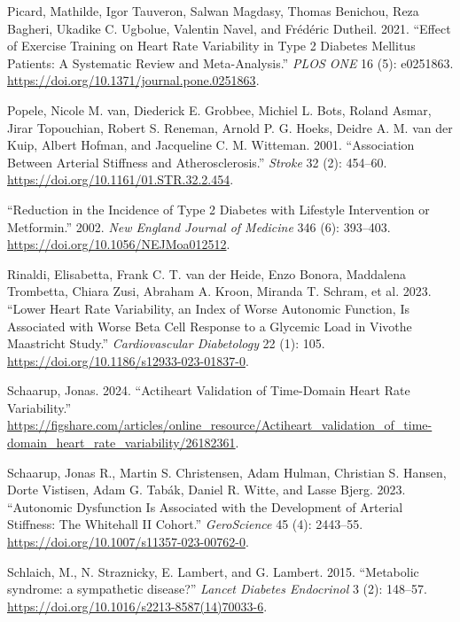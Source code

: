 \documentclass[
  a4paper,
  headsepline=true,
  open=any]{scrbook}
\newlength{\cslhangindent}
\newlength{\cslentryspacingunit} %
\newenvironment{CSLReferences}[2] %
 {%
  \setlength{\parindent}{0pt}
  \ifodd #1
  \let\oldpar\par
  \def\par{\hangindent=\cslhangindent\oldpar}
  \fi
  \setlength{\parskip}{#2\cslentryspacingunit}
 }%
 {}
\begin{document}
\begin{CSLReferences}{1}{0}
\leavevmode{}%
Picard, Mathilde, Igor Tauveron, Salwan Magdasy, Thomas Benichou, Reza
Bagheri, Ukadike C. Ugbolue, Valentin Navel, and Frédéric Dutheil. 2021.
{``Effect of Exercise Training on Heart Rate Variability in Type 2
Diabetes Mellitus Patients: A Systematic Review and Meta-Analysis.''}
\emph{PLOS ONE} 16 (5): e0251863.
\url{https://doi.org/10.1371/journal.pone.0251863}.

\leavevmode{}%
Popele, Nicole M. van, Diederick E. Grobbee, Michiel L. Bots, Roland
Asmar, Jirar Topouchian, Robert S. Reneman, Arnold P. G. Hoeks, Deidre
A. M. van der Kuip, Albert Hofman, and Jacqueline C. M. Witteman. 2001.
{``Association Between Arterial Stiffness and Atherosclerosis.''}
\emph{Stroke} 32 (2): 454--60.
\url{https://doi.org/10.1161/01.STR.32.2.454}.

\leavevmode{}%
{``Reduction in the Incidence of Type 2 Diabetes with Lifestyle
Intervention or Metformin.''} 2002. \emph{New England Journal of
Medicine} 346 (6): 393--403. \url{https://doi.org/10.1056/NEJMoa012512}.

\leavevmode{}%
Rinaldi, Elisabetta, Frank C. T. van der Heide, Enzo Bonora, Maddalena
Trombetta, Chiara Zusi, Abraham A. Kroon, Miranda T. Schram, et al.
2023. {``Lower Heart Rate Variability, an Index of Worse Autonomic
Function, Is Associated with Worse Beta Cell Response to a Glycemic Load
in Vivo{\textemdash}the Maastricht Study.''} \emph{Cardiovascular
Diabetology} 22 (1): 105.
\url{https://doi.org/10.1186/s12933-023-01837-0}.

\leavevmode{}%
Schaarup, Jonas. 2024. {``Actiheart Validation of Time-Domain Heart Rate
Variability.''}
\url{https://figshare.com/articles/online_resource/Actiheart_validation_of_time-domain_heart_rate_variability/26182361}.

\leavevmode{}%
Schaarup, Jonas R., Martin S. Christensen, Adam Hulman, Christian S.
Hansen, Dorte Vistisen, Adam G. Tabák, Daniel R. Witte, and Lasse Bjerg.
2023. {``Autonomic Dysfunction Is Associated with the Development of
Arterial Stiffness: The Whitehall II Cohort.''} \emph{GeroScience} 45
(4): 2443--55. \url{https://doi.org/10.1007/s11357-023-00762-0}.

\leavevmode{}%
Schlaich, M., N. Straznicky, E. Lambert, and G. Lambert. 2015.
{``Metabolic syndrome: a sympathetic disease?''} \emph{Lancet Diabetes
Endocrinol} 3 (2): 148--57.
\url{https://doi.org/10.1016/s2213-8587(14)70033-6}.


\end{CSLReferences}
\end{document}
